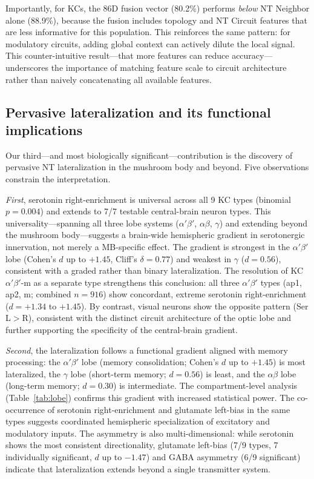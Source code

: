 \documentclass[10pt]{article}
\begin{document}
Importantly, for KCs, the 86D fusion vector (80.2\%) performs \textit{below} NT Neighbor alone (88.9\%), because the fusion includes topology and NT Circuit features that are less informative for this population. This reinforces the same pattern: for modulatory circuits, adding global context can actively dilute the local signal. This counter-intuitive result---that more features can reduce accuracy---underscores the importance of matching feature scale to circuit architecture rather than naively concatenating all available features.

\subsection*{Pervasive lateralization and its functional implications}

Our third---and most biologically significant---contribution is the discovery of pervasive NT lateralization in the mushroom body and beyond. Five observations constrain the interpretation.

\textit{First}, serotonin right-enrichment is universal across all 9 KC types (binomial $p = 0.004$) and extends to 7/7 testable central-brain neuron types. This universality---spanning all three lobe systems ($\alpha'\beta'$, $\alpha\beta$, $\gamma$) and extending beyond the mushroom body---suggests a brain-wide hemispheric gradient in serotonergic innervation, not merely a MB-specific effect. The gradient is strongest in the $\alpha'\beta'$ lobe (Cohen's $d$ up to $+1.45$, Cliff's $\delta = 0.77$) and weakest in $\gamma$ ($d = 0.56$), consistent with a graded rather than binary lateralization. The resolution of KC$\alpha'\beta'$-m as a separate type strengthens this conclusion: all three $\alpha'\beta'$ types (ap1, ap2, m; combined $n = 916$) show concordant, extreme serotonin right-enrichment ($d = +1.34$ to $+1.45$). By contrast, visual neurons show the opposite pattern (Ser L$>$R), consistent with the distinct circuit architecture of the optic lobe and further supporting the specificity of the central-brain gradient.

\textit{Second}, the lateralization follows a functional gradient aligned with memory processing: the $\alpha'\beta'$ lobe (memory consolidation; Cohen's $d$ up to $+1.45$) is most lateralized, the $\gamma$ lobe (short-term memory; $d = 0.56$) is least, and the $\alpha\beta$ lobe (long-term memory; $d = 0.30$) is intermediate. The compartment-level analysis (Table~\ref{tab:lobe}) confirms this gradient with increased statistical power. The co-occurrence of serotonin right-enrichment and glutamate left-bias in the same types suggests coordinated hemispheric specialization of excitatory and modulatory inputs. The asymmetry is also multi-dimensional: while serotonin shows the most consistent directionality, glutamate left-bias (7/9 types, 7 individually significant, $d$ up to $-1.47$) and GABA asymmetry (6/9 significant) indicate that lateralization extends beyond a single transmitter system.
\end{document}
